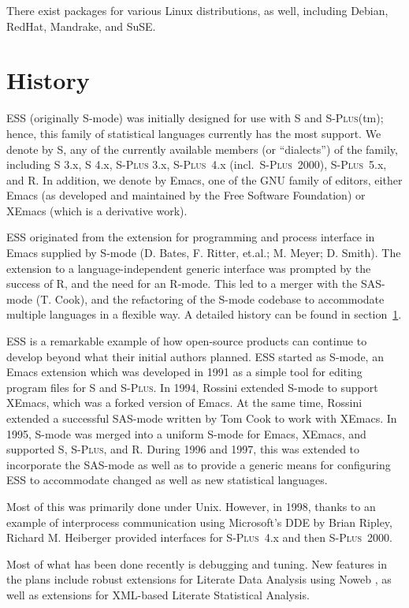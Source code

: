 \documentclass{article}
\newcommand*{\Splus}{\textsc{S-Plus}}
\begin{document}
There exist packages for various Linux distributions, as well,
including Debian, RedHat, Mandrake, and SuSE.

\section{History}
\label{sec:history}

ESS (originally S-mode) was initially designed for use with S and
\Splus(tm); hence, this family of statistical languages currently has
the most support.  We denote by S, any of the currently available
members (or ``dialects'') of the family, including S 3.x, S 4.x, \Splus
3.x, \Splus~4.x (incl.\ \Splus~2000), \Splus~5.x, and R.  In addition, we
denote by Emacs, one of the GNU family of editors, either Emacs (as
developed and maintained by the Free Software Foundation) or XEmacs (which
is a derivative work).

ESS originated from the extension for programming and process
interface in Emacs supplied by S-mode (D. Bates, F. Ritter, et.al.; 
M. Meyer; D. Smith).  The extension to a language-independent generic
interface was prompted by the success of R, and the need for an
R-mode.  This led to a merger with the SAS-mode (T. Cook), and the
refactoring of the S-mode codebase to accommodate multiple languages
in a flexible way.  A detailed history can be found in
section~\ref{sec:history}.

ESS is a remarkable example of how open-source products can continue
to develop beyond what their initial authors planned.  ESS started as
S-mode, an Emacs extension which was developed in 1991 as a simple
tool for editing program files for S and \Splus.  In 1994, Rossini
extended S-mode to support XEmacs, which was a forked version of
Emacs.  At the same time, Rossini extended a successful SAS-mode
written by Tom Cook to work with XEmacs.  In 1995, S-mode was merged
into a uniform S-mode for Emacs, XEmacs, and supported S, \Splus, and
R. During 1996 and 1997, this was extended to incorporate the
SAS-mode as well as to provide a generic means for configuring ESS to
accommodate changed as well as new statistical languages.

Most of this was primarily done under Unix.  However, in 1998, thanks
to an example of interprocess communication using Microsoft's DDE by
Brian Ripley, Richard M. Heiberger provided interfaces for \Splus~4.x
and then \Splus~2000.

Most of what has been done recently is debugging and tuning.  New
features in the plans include robust extensions for Literate Data
Analysis using Noweb \citep{NRamsey:1994}, as well as extensions for
XML-based Literate Statistical Analysis.
\end{document}
